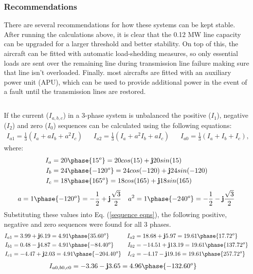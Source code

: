        \subsubsection*{Recommendations}
            There are several recommendations for how these systems can be kept stable. After running the calculations above, it is clear that the 0.12 MW line capacity can be upgraded for a larger threshold and better stability. On top of this, the aircraft can be fitted with automatic load-shedding measures, so only essential loads are sent over the remaining line during transmission line failure making sure that line isn't overloaded. Finally. most aircrafts are fitted with an auxiliary power unit (APU), which can be used to provide additional power in the event of a fault until the transmission lines are restored.
            
    \subsection{}
        If the current (\(I_{a, b, c}\)) in a 3-phase system is unbalanced the positive (\(I_1\)), negative (\(I_2\)) and zero (\(I_0\)) sequences can be calculated using the following equations:
        \begin{align}
            I_{a1} = \frac{1}{3}\left(I_a + aI_b + a^2I_c\right) && I_{a2} = \frac{1}{3}\left(I_a + a^2I_b + aI_c\right) && I_{a0} = \frac{1}{3}\left(I_a + I_b + I_c\right), \label{sequence eqns}
        \end{align}
        where:
        \begin{align}
            I_a &= 20\phase{15^o} = 20cos(15) + \textbf{j}20sin(15) \\
            I_b &= 24\phase{-120^o} = 24cos(-120) + \textbf{j}24sin(-120) \\
            I_c &= 18\phase{165^o} = 18cos(165) + \textbf{j}18sin(165)
        \end{align}
        \begin{align}
            a = 1\phase{-120^o} = -\frac{1}{2} + \textbf{j}\frac{\sqrt{3}}{2} && a^2 = 1\phase{-240^o} = -\frac{1}{2} - \textbf{j}\frac{\sqrt{3}}{2}
        \end{align}
        Substituting these values into Eq. (\ref{sequence eqns}), the following positive, negative and zero sequences were found for all 3 phases.
        \begin{align}
            I_{a1} &= 3.99 + \textbf{j}6.19 = 4.91\phase{35.60^o} & I_{a2} &= 18.68 + \textbf{j}5.97 = 19.61\phase{17.72^o} \\ I_{b1} &= 0.48 - \textbf{j}4.87 = 4.91\phase{-84.40^o} & I_{b2} &= -14.51 + \textbf{j}13.19 = 19.61\phase{137.72^o}\\
            I_{c1} &= -4.47 + \textbf{j}2.03 = 4.91\phase{-204.40^o} & I_{c2} &= -4.17 - \textbf{j}19.16 = 19.61\phase{257.72^o}
        \end{align}
        \begin{align}
            I_{a0, b0, c0} &= -3.36 - \textbf{j}3.65 = 4.96\phase{-132.60^o}
        \end{align}

